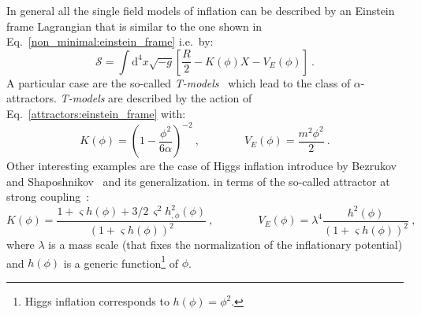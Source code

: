 In general all the single field models of inflation can be described by an Einstein frame Lagrangian that is similar to the one shown in Eq.~\eqref{non_minimal:einstein_frame} i.e.\ by:
\begin{equation}
	\label{attractors:einstein_frame}
	\mathcal{S} = \int \textrm{d}^4 x \sqrt{-g} \left[ \frac{R}{2} - K(\phi)X -V_E(\phi)  \right] \ .
\end{equation}
A particular case are the so-called \emph{T-models}~\cite{Kallosh:2013hoa,Kaiser:2013sna,Kallosh:2013daa,Kallosh:2013tua,Kallosh:2013yoa,Kallosh:2014rga,Kallosh:2015lwa} which lead to the class of $\alpha$-attractors. \emph{T-models} are described by the action of Eq.~\eqref{attractors:einstein_frame} with:
\begin{equation}
\label{eq:Tmodels}
	K(\phi) = \left(1 - \frac{\phi^2}{6 \alpha} \right)^{-2} \ , \qquad \qquad V_E(\phi) = \frac{m^2 \phi^2}{ 2} \ .
\end{equation}
Other interesting examples are the case of Higgs inflation introduce by Bezrukov and Shaposhnikov~\cite{Bezrukov:2007ep,Bezrukov:2009db} and its generalization. in terms of the so-called attractor at strong coupling~\cite{Kallosh:2013tua}: 
\begin{equation}
	\label{attractors:model_def}
	K(\phi) = \frac{1+\varsigma h(\phi) + 3/2 \, \varsigma^2 h_{,\phi}^2(\phi)}{(1+\varsigma h(\phi))^2} \ , \qquad \qquad V_E(\phi) = \lambda^4 \frac{ h^2(\phi)}{ \left( 1 + \varsigma h(\phi) \right)^2} \ ,
\end{equation}
where $\lambda$ is a mass scale (that fixes the normalization of the inflationary potential) and $h(\phi)$ is a generic function\footnote{Higgs inflation corresponds to $h(\phi)=\phi^2$.} of $\phi$.



